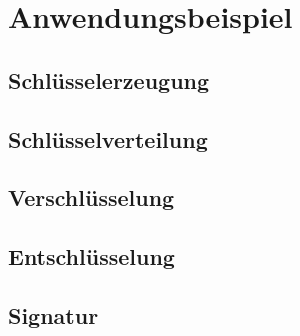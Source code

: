 \chapter{Anwendungsbeispiel}

\section{Schlüsselerzeugung}



\newpage
\section{Schlüsselverteilung}
\newpage
\section{Verschlüsselung}
\newpage
\section{Entschlüsselung}
\newpage
\section{Signatur}
